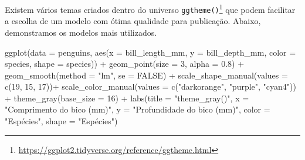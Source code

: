 \documentclass[
]{book}
\newenvironment{Shaded}{\begin{snugshade}}{\end{snugshade}}
\newcommand{\AttributeTok}[1]{\textcolor[rgb]{0.61,0.61,0.61}{#1}}
\newcommand{\ConstantTok}[1]{\textcolor[rgb]{0,0,0}{#1}}
\newcommand{\DecValTok}[1]{\textcolor[rgb]{0.06,0.06,0.06}{#1}}
\newcommand{\FloatTok}[1]{\textcolor[rgb]{0.06,0.06,0.06}{#1}}
\newcommand{\FunctionTok}[1]{\textcolor[rgb]{0,0,0}{#1}}
\newcommand{\NormalTok}[1]{#1}
\newcommand{\SpecialCharTok}[1]{\textcolor[rgb]{0,0,0}{#1}}
\newcommand{\StringTok}[1]{\textcolor[rgb]{0.5,0.5,0.5}{#1}}
\renewcommand{\href}[2]{#2\footnote{\url{#1}}}
\begin{document}
Existem vários temas criados dentro do universo \href{https://ggplot2.tidyverse.org/reference/ggtheme.html}{\texttt{ggtheme()}} que podem facilitar a escolha de um modelo com ótima qualidade para publicação. Abaixo, demonstramos os modelos mais utilizados.

\begin{Shaded}
\begin{Highlighting}[]
\FunctionTok{ggplot}\NormalTok{(}\AttributeTok{data =}\NormalTok{ penguins, }
       \FunctionTok{aes}\NormalTok{(}\AttributeTok{x =}\NormalTok{ bill\_length\_mm, }
           \AttributeTok{y =}\NormalTok{ bill\_depth\_mm,}
           \AttributeTok{color =}\NormalTok{ species,}
           \AttributeTok{shape =}\NormalTok{ species)) }\SpecialCharTok{+}
  \FunctionTok{geom\_point}\NormalTok{(}\AttributeTok{size =} \DecValTok{3}\NormalTok{, }
             \AttributeTok{alpha =} \FloatTok{0.8}\NormalTok{) }\SpecialCharTok{+}
  \FunctionTok{geom\_smooth}\NormalTok{(}\AttributeTok{method =} \StringTok{"lm"}\NormalTok{, }\AttributeTok{se =} \ConstantTok{FALSE}\NormalTok{) }\SpecialCharTok{+}
  \FunctionTok{scale\_shape\_manual}\NormalTok{(}\AttributeTok{values =} \FunctionTok{c}\NormalTok{(}\DecValTok{19}\NormalTok{, }\DecValTok{15}\NormalTok{, }\DecValTok{17}\NormalTok{))}\SpecialCharTok{+}
  \FunctionTok{scale\_color\_manual}\NormalTok{(}\AttributeTok{values =} \FunctionTok{c}\NormalTok{(}\StringTok{"darkorange"}\NormalTok{, }\StringTok{"purple"}\NormalTok{, }\StringTok{"cyan4"}\NormalTok{)) }\SpecialCharTok{+}
  \FunctionTok{theme\_gray}\NormalTok{(}\AttributeTok{base\_size =} \DecValTok{16}\NormalTok{) }\SpecialCharTok{+}
  \FunctionTok{labs}\NormalTok{(}\AttributeTok{title =} \StringTok{"theme\_gray()"}\NormalTok{, }\AttributeTok{x =} \StringTok{"Comprimento do bico (mm)"}\NormalTok{, }\AttributeTok{y =} \StringTok{"Profundidade do bico (mm)"}\NormalTok{, }
       \AttributeTok{color =} \StringTok{"Espécies"}\NormalTok{, }\AttributeTok{shape =} \StringTok{"Espécies"}\NormalTok{) }


\end{Highlighting}
\end{Shaded}
\end{document}
